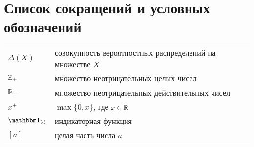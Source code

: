 \chapter*{Список сокращений и условных обозначений}             %



\begin{tabular}{p{3cm}p{12.5cm}}
  $\Delta(X)$ & совокупность вероятностных распределений на множестве $X$ \\
  $\mathbb{Z}_+$ & множество неотрицательных целых чисел \\
  $\mathbb{R}_+$ & множество неотрицательных действительных чисел \\
  $x^+$ & $\max\{0, x\}$, где $x \in \mathbb{R}$ \\
  $\Ind_{(\cdot)}$ & индикаторная функция \\
  $[a]$ & целая часть числа $a$
\end{tabular}

